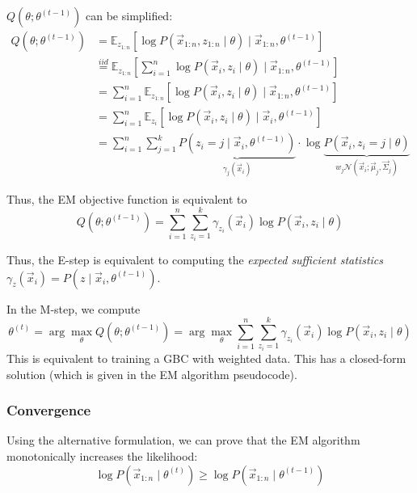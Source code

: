 $Q(\theta; \theta^{(t-1)})$ can be simplified:
\begin{align*}
        Q(\theta; \theta^{(t-1)}) &=
    \mathbb{E}_{z_{1:n}}\left[
        \log{P(\vec{x}_{1:n}, z_{1:n} \mid \theta)} \mid \vec{x}_{1:n}, \theta^{(t-1)}
    \right] \\
    &\overset{iid}{=} \mathbb{E}_{z_{1:n}}\left[
        \sum_{i=1}^n{
        \log{P(\vec{x}_i, z_i \mid \theta)} \mid \vec{x}_{1:n}, \theta^{(t-1)}
        }
    \right] \\
    &= \sum_{i=1}^n{ \mathbb{E}_{z_{1:n}}\left[
        \log{P(\vec{x}_i, z_i \mid \theta)} \mid \vec{x}_{1:n}, \theta^{(t-1)}
    \right]
    } \\
    &= \sum_{i=1}^n{ \mathbb{E}_{z_i}\left[
        \log{P(\vec{x}_i, z_i \mid \theta)} \mid \vec{x}_i, \theta^{(t-1)}
    \right]
    } \\
    &= \sum_{i=1}^n{
        \sum_{j=1}^k{
            \underbrace{P(z_i = j \mid \vec{x}_i, \theta^{(t-1)})}_{\gamma_j(\vec{x}_i)}
            \cdot
            \log{\underbrace{P(\vec{x}_i, z_i = j \mid \theta)}_{w_j \mathcal{N}(\vec{x}_i; \vec{\mu}_j, \vec{\Sigma}_j)}}
        }
    }
\end{align*}

Thus, the EM objective function is equivalent to
\begin{equation*}
    Q(\theta; \theta^{(t-1)})
    = \sum_{i=1}^n{\sum_{z_i=1}^k{
        \gamma_{z_i}(\vec{x}_i)
        \log{P(\vec{x}_i, z_i \mid \theta)}
    }}
\end{equation*}

Thus, the E-step is equivalent to computing
the \emph{expected sufficient statistics}
$\gamma_z(\vec{x}_i) = P(z \mid \vec{x}_i, \theta^{(t-1)})$.

In the M-step, we compute
\begin{equation*}
    \theta^{(t)} = \arg\max_\theta{
        Q(\theta; \theta^{(t-1)})
    }
    = \arg\max_\theta{
        \sum_{i=1}^n{
        \sum_{z_i=1}^k{
            \gamma_{z_i}(\vec{x}_i)
            \log{P(\vec{x}_i, z_i \mid \theta)}
        }
        }
    }
\end{equation*}
This is equivalent to training a GBC with
weighted data.
This has a closed-form solution
(which is given in the EM algorithm pseudocode).

\subsubsection{Convergence}
Using the alternative formulation,
we can prove that the EM algorithm
monotonically increases the likelihood:
\begin{equation*}
    \log{P(\vec{x}_{1:n} \mid \theta^{(t)})}
    \geq
    \log{P(\vec{x}_{1:n} \mid \theta^{(t-1)})}
\end{equation*}

